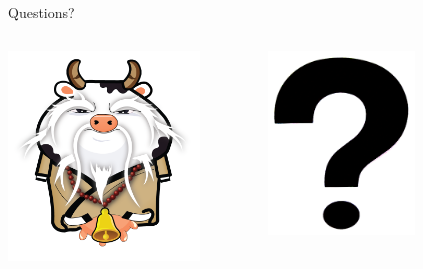 \documentclass[aspectratio=43]{beamer}
\begin{document}
\begin{frame}{Questions?}
    \begin{columns}
        \begin{column}[c]{0.5\textwidth}
            \includegraphics[width=0.8\textwidth]{images/holycow.png}
        \end{column}
        \begin{column}[c]{0.5\textwidth}
            \includegraphics[width=0.6\textwidth]{images/questions.png}
        \end{column}
    \end{columns}
\end{frame}
\end{document}

